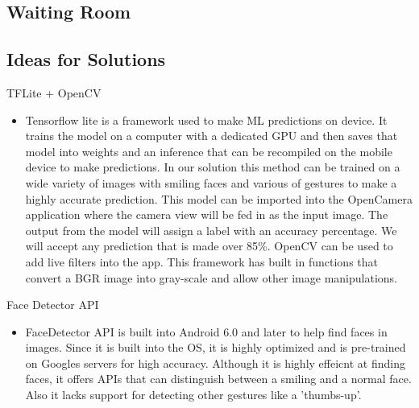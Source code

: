 \documentclass[12pt, titlepage]{article}
\begin{document}
\subsection{Waiting Room}

\subsection{Ideas for Solutions}
TFLite + OpenCV
\begin{itemize}
\item Tensorflow lite is a framework used to make ML predictions on device. It trains the model on a computer with a dedicated GPU and then saves that model into weights and an inference that can be recompiled on the mobile device to make predictions. In our solution this method can be trained on a wide variety of images with smiling faces and various of gestures to make a highly accurate prediction. This model can be imported into the OpenCamera application where the camera view will be fed in as the input image. The output from the model will assign a label with an accuracy percentage. We will accept any prediction that is made over 85\%. OpenCV can be used to add live filters into the app. This framework has built in functions that convert a BGR image into gray-scale and allow other image manipulations. 
\end{itemize}

Face Detector API
\begin{itemize}
\item FaceDetector API is built into Android 6.0 and later to help find faces in images. Since it is built into the OS, it is highly optimized and is pre-trained on Googles servers for high accuracy. Although it is highly effeicnt at finding faces, it offers APIs that can distinguish between a smiling and a normal face. Also it lacks support for detecting other gestures like a 'thumbs-up'.
\end{itemize}
\end{document}
